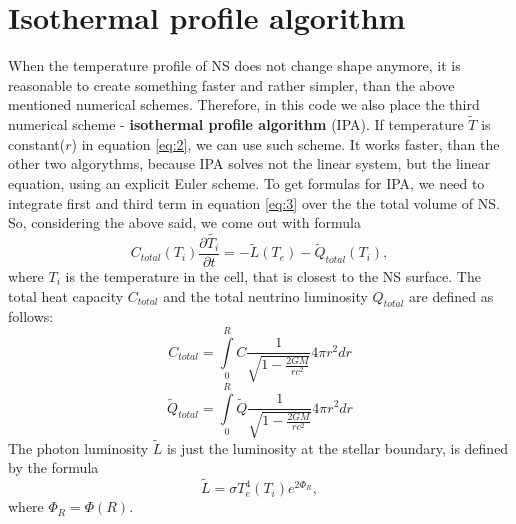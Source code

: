 \documentclass[preprint,pre,floats,aps,amsmath,amssymb]{revtex4}
\begin{document}
\section{Isothermal profile algorithm}
\par When the temperature profile of NS does not change shape anymore, it is reasonable to create something faster and rather simpler, than the above mentioned numerical schemes. Therefore, in this code we also place the third numerical scheme - \textbf{isothermal profile algorithm} (IPA). If  temperature $\tilde{T}$ is constant($r$) in equation \ref{eq:2}, we can use such scheme. It works faster, than the other two algorythms, because IPA solves not the linear system, but the linear equation, using an explicit Euler scheme. To get formulas for IPA, we need to integrate first and third term in equation \ref{eq:3} over the the total volume of NS. So, considering the above said, we come out with formula
\begin{equation*}
C_{total}(T_{i})\frac{\partial \tilde{T_{i}}}{\partial t} = -\tilde{L}(T_{e}) - \tilde{Q}_{total}(T_{i}),
 \end{equation*}
 where $T_{i}$ is the temperature in the cell, that is closest to the NS surface. The total heat capacity $C_{total}$ and the total neutrino luminosity $Q_{total}$ are defined as follows:
\begin{equation*}
C_{total} = \int\limits_{0}^{R} C\frac{1}{\sqrt{1 - \frac{2GM}{rc^{2}}}} 4 \pi r^{2} dr
 \end{equation*}
 \begin{equation*}
\tilde{Q}_{total} = \int\limits_{0}^{R} \tilde{Q}\frac{1}{\sqrt{1 - \frac{2GM}{rc^{2}}}} 4 \pi r^{2} dr
 \end{equation*}
 The photon luminosity $\tilde{L}$ is just the luminosity at the stellar boundary, is defined by the formula
  \begin{equation*}
\tilde{L} = \sigma T^{4}_e (T_{i})e^{2\Phi_{R}},
 \end{equation*}
 where $\Phi_{R} = \Phi(R)$.
\end{document}
